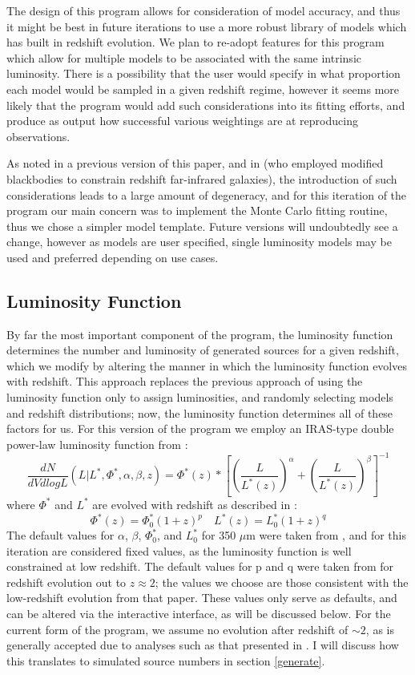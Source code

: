 \documentclass[twocolumn,letterpaper,10pt]{article}
\begin{document}
The design of this program allows for consideration of model accuracy, and thus it might be best in future iterations to use a more robust library of models which has built in redshift evolution. We plan to re-adopt features for this program which allow for multiple models to be associated with the same intrinsic luminosity. There is a possibility that the user would specify in what proportion each model would be sampled in a given redshift regime, however it seems more likely that the program would add such considerations into its fitting efforts, and produce as output how successful various weightings are at reproducing observations. 

As noted in a previous version of this paper, and in \citet {wiklind03} (who employed modified blackbodies to constrain redshift far-infrared galaxies), the introduction of such considerations leads to a large amount of degeneracy, and for this iteration of the program our main concern was to implement the Monte Carlo fitting routine, thus we chose a simpler model template. Future versions will undoubtedly see a change, however as models are user specified, single luminosity models may be used and preferred depending on use cases.

\subsection{Luminosity Function}\label{sec:lf}

By far the most important component of the program, the luminosity function determines the number and luminosity of generated sources for a given redshift, which we modify by altering the manner in which the luminosity function evolves with redshift. This approach replaces the previous approach of using the luminosity function only to assign luminosities, and randomly selecting models and redshift distributions; now, the luminosity function determines all of these factors for us. For this version of the program we employ an IRAS-type double power-law luminosity function from \citet{negrello13}:
$$
\frac{dN}{dV dlogL}(L|L^*,\Phi^*,\alpha,\beta,z) = \Phi^*(z)*\left[{\left(\frac{L}{L^*(z)}\right)}^{\alpha}+\left(\frac{L}{L^*(z)}\right)^{\beta}\right]^{-1}
$$
where $\Phi^*$ and $L^*$ are evolved with redshift as described in \citet{Caputi07}:
$$
\Phi^*(z) = \Phi^*_0(1+z)^p \quad
L^*(z) = L^*_0(1+z)^q
$$
The default values for $\alpha$, $\beta$, $\Phi^*_0$, and $L^*_0$ for 350 $\mu$m were taken from \citet{negrello13}, and for this iteration are considered fixed values, as the luminosity function is well constrained at low redshift. The default values for p and q were taken from \citet{Caputi07} for redshift evolution out to $z\approx2$; the values we choose are those consistent with the low-redshift evolution from that paper. These values only serve as defaults, and can be altered via the interactive interface, as will be discussed below. For the current form of the program, we assume no evolution after redshift of $\sim2$, as is generally accepted due to analyses such as that presented in \citet{marsden11}. I will discuss how this translates to simulated source numbers in section \ref{generate}.
\end{document}
